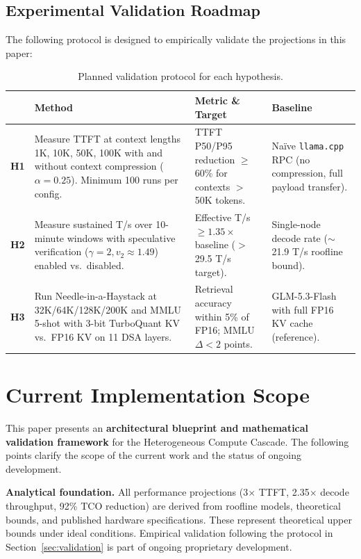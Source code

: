 \documentclass[11pt,a4paper]{article}
\begin{document}
\subsection{Experimental Validation Roadmap}
The following protocol is designed to empirically validate the projections in this paper:

\begin{table}[ht!]
\centering
\caption{Planned validation protocol for each hypothesis.}
\vspace{0.2cm}
\begin{tabular}{p{1.2cm} p{3.5cm} p{4cm} p{4cm}}
\toprule
 & \textbf{Method} & \textbf{Metric \& Target} & \textbf{Baseline} \\
\midrule
\textbf{H1} & Measure TTFT at context lengths 1K, 10K, 50K, 100K with and without context compression ($\alpha = 0.25$). Minimum 100 runs per config. & TTFT P50/P95 reduction $\geq$60\% for contexts $>$50K tokens. & Na\"ive \texttt{llama.cpp} RPC (no compression, full payload transfer). \\
\midrule
\textbf{H2} & Measure sustained T/s over 10-minute windows with speculative verification ($\gamma = 2, v_2 \approx 1.49$) enabled vs.\ disabled. & Effective T/s $\geq 1.35\times$ baseline ($>$29.5 T/s target). & Single-node decode rate ($\sim$21.9 T/s roofline bound). \\
\midrule
\textbf{H3} & Run Needle-in-a-Haystack at 32K/64K/128K/200K and MMLU 5-shot with 3-bit TurboQuant KV vs.\ FP16 KV on 11 DSA layers. & Retrieval accuracy within 5\% of FP16; MMLU $\Delta < 2$ points. & GLM-5.3-Flash with full FP16 KV cache (reference). \\
\bottomrule
\end{tabular}
\label{tab:validation}
\end{table}

\section{Current Implementation Scope}

This paper presents an \textbf{architectural blueprint and mathematical validation framework} for the Heterogeneous Compute Cascade. The following points clarify the scope of the current work and the status of ongoing development.

\textbf{Analytical foundation.} All performance projections (3$\times$ TTFT, 2.35$\times$ decode throughput, 92\% TCO reduction) are derived from roofline models, theoretical bounds, and published hardware specifications. These represent theoretical upper bounds under ideal conditions. Empirical validation following the protocol in Section~\ref{sec:validation} is part of ongoing proprietary development.
\end{document}
